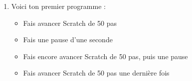 \documentclass[class=report,crop=false, 12pt]{standalone}
\begin{document}
\begin{activite}
\begin{enumerate}
  \item Voici ton premier programme :
  \begin{itemize}
    \item Fais avancer Scratch de 50 pas
    \item Fais une pause d'une seconde
    \item Fais encore avancer Scratch de 50 pas, puis une pause
    \item Fais avancer Scratch de 50 pas une dernière fois
  \end{itemize}
  

\end{enumerate}
 
\end{activite}
\end{document}
